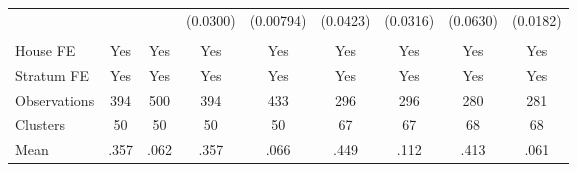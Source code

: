 {\begin{tabular}{l*{8}{c}}
                &         &         & (0.0300)&(0.00794)& (0.0423)& (0.0316)& (0.0630)& (0.0182)\\
                &         &         &         &         &         &         &         &         \\
House FE        &      Yes&      Yes&      Yes&      Yes&      Yes&      Yes&      Yes&      Yes\\
Stratum FE      &      Yes&      Yes&      Yes&      Yes&      Yes&      Yes&      Yes&      Yes\\
\midrule
Observations    &      394&      500&      394&      433&      296&      296&      280&      281\\
Clusters        &       50&       50&       50&       50&       67&       67&       68&       68\\
Mean            &     .357&     .062&     .357&     .066&     .449&     .112&     .413&     .061\\
\bottomrule
\end{tabular}
}
